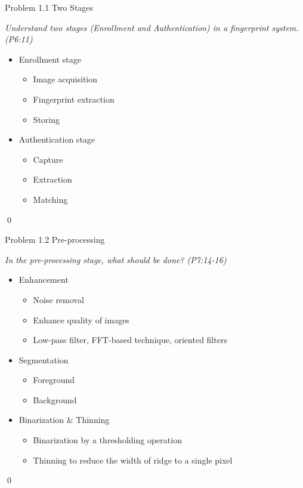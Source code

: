 \documentclass[
        ]{beamer}
\begin{document}
    		\begin{frame}[t]{Problem 1.1 Two Stages}
    			\begin{overprint}
    			\emph{Understand two stages (Enrollment and Authentication) in a fingerprint system. (P6:11)}
    				\onslide<2>  %
    				\onslide<3> 
    				\begin{itemize}
    				\item Enrollment stage  				
    					\begin{itemize}
    					\item Image acquisition
    					\item Fingerprint extraction
    					\item Storing
    					\end{itemize}		
    				\item Authentication stage 				
    					\begin{itemize}
    					\item Capture
    					\item Extraction
    					\item Matching
    					\end{itemize}		
    				\end{itemize}							\qed		
    			\end{overprint}
    		\end{frame}
    
    		\begin{frame}[t]{Problem 1.2 Pre-processing}
    			\begin{overprint}
    				\onslide<1>
    			\emph{In the pre-processing stage, what should be done?  (P7:14-16)}
    				\onslide<2> \inpdfc{7}{14} %
    				\onslide<3> \inpdfc{7}{15} %
    				\onslide<4> \inpdfc{7}{16} %
    				\onslide<5> 
    				\begin{itemize}
    				\item Enhancement    				
    					\begin{itemize}
    					\item Noise removal
    					\item Enhance quality of images
    					\item Low-pass filter, FFT-based technique, oriented filters
    					\end{itemize}		
    				\item Segmentation    				
    					\begin{itemize}
    					\item Foreground
    					\item Background
    					\end{itemize}		
    				\item Binarization \& Thinning    				
    					\begin{itemize}
    					\item Binarization by a thresholding operation
    					\item Thinning to reduce the width of ridge to a single pixel
    					\end{itemize}	
    				\end{itemize}							\qed		
    			\end{overprint}
    		\end{frame}
    
\end{document}
